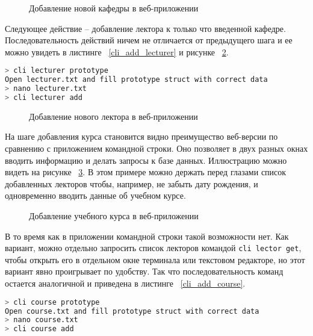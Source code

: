 \begin{figure}[h!]
	\caption{Добавление новой кафедры в веб-приложении}
	\label{web_add_department}
\end{figure}

Следующее действие -- добавление лектора к только что введенной кафедре. Последовательность действий
ничем не отличается от предыдущего шага и ее можно увидеть в листинге ~\ref{cli_add_lecturer} и рисунке
~\ref{web_add_lecturer}.

\begin{lstlisting}[language=bash, caption = {Добавление лектора}, captionpos=b, label={cli_add_lecturer}]
> cli lecturer prototype
Open lecturer.txt and fill prototype struct with correct data
> nano lecturer.txt 
> cli lecturer add
\end{lstlisting}

\begin{figure}[h!]
	\caption{Добавление нового лектора в веб-приложении}
	\label{web_add_lecturer}
\end{figure}

На шаге добавления курса становится видно преимущество веб-версии по сравнению с приложением командной строки.
Оно позволяет в двух разных окнах вводить информацию и делать запросы к базе данных. Иллюстрацию можно видеть
на рисунке ~\ref{web_add_course}. В этом примере можно держать перед глазами список добавленных лекторов чтобы,
например, не забыть дату рождения, и одновременно вводить данные об учебном курсе.

\begin{figure}[h!]
	\caption{Добавление учебного курса в веб-приложении}
	\label{web_add_course}
\end{figure}

В то время как в приложении командной строки такой возможности нет. Как вариант, можно отдельно запросить список
лекторов командой \texttt{cli lector get}, чтобы открыть его в отдельном окне терминала или текстовом редакторе, но этот вариант 
явно проигрывает по удобству. Так что последовательность команд остается аналогичной и приведена в листинге ~\ref{cli_add_course}.

\begin{lstlisting}[language=bash, caption = {Добавление лектора}, captionpos=b, label={cli_add_course}]
> cli course prototype
Open course.txt and fill prototype struct with correct data
> nano course.txt 
> cli course add
\end{lstlisting}

